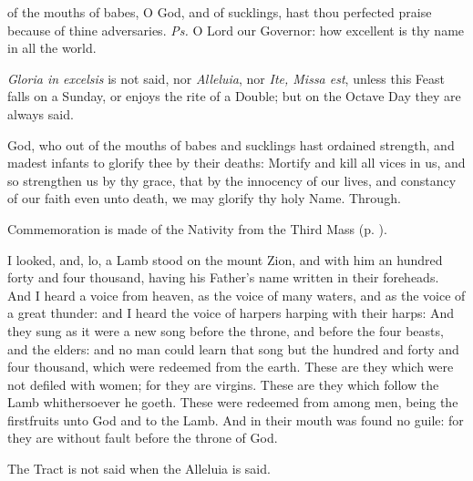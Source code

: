 
\introit
{} of the mouths of babes, O God, and of sucklings, hast thou perfected praise because of thine adversaries. \textit{Ps.} O Lord our Governor: how excellent is thy name in all the world.
\begin{rubric}
    \emph{Gloria in excelsis} is not said, nor \emph{Alleluia}, nor \emph{Ite, Missa est}, unless this Feast falls on a Sunday, or enjoys the rite of a  Double; but on the Octave Day they are always said.
\end{rubric}
\collect
{} God, who out of the mouths of babes and sucklings hast ordained strength, and madest infants to glorify thee by their deaths: Mortify and kill all vices in us, and so strengthen us by thy grace, that by the innocency of our lives, and constancy of our faith even unto death, we may glorify thy holy Name. Through.
\begin{rubric}
    Commemoration is made of the Nativity from the Third Mass (p. \pageref{NativityMassIII}).
\end{rubric}
 I looked, and, lo, a Lamb stood on the mount Zion, and with him an hundred forty and four thousand, having his Father's name written in their foreheads. And I heard a voice from heaven, as the voice of many waters, and as the voice of a great thunder: and I heard the voice of harpers harping with their harps: And they sung as it were a new song before the throne, and before the four beasts, and the elders: and no man could learn that song but the hundred and forty and four thousand, which were redeemed from the earth. These are they which were not defiled with women; for they are virgins. These are they which follow the Lamb whithersoever he goeth. These were redeemed from among men, being the firstfruits unto God and to the Lamb. And in their mouth was found no guile: for they are without fault before the throne of God.
\begin{rubric}
     The Tract is not said when the Alleluia is said.
\end{rubric}
